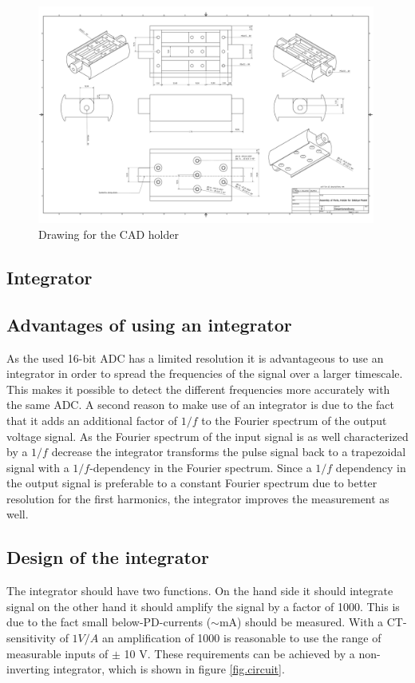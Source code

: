    
   \begin{figure}
\includegraphics[width=0.99\textwidth]{figures/Gesamtanordnung.pdf}
    \caption{Drawing for the CAD holder}
    \label{fig.CADdrawing}
   \end{figure}

\subsection{Integrator}
\subsection{Advantages of using an integrator}
As the used 16-bit ADC has a limited resolution it is advantageous to use an integrator in order to spread the frequencies of the signal over a larger timescale. This makes it possible to detect the different frequencies more accurately with the same ADC. 
A second reason to make use of an integrator is due to the fact that it adds an additional factor of $1/f$ to the Fourier spectrum of the output voltage signal. As the Fourier spectrum of the input signal is as well characterized by a $1/f$ decrease the integrator transforms the pulse signal back to a trapezoidal signal with a $1/f$-dependency in the Fourier spectrum. Since a $1/f$ dependency in the output signal is preferable to a constant Fourier spectrum due to better resolution for the first harmonics, the integrator improves the measurement as well. 

\subsection{Design of the integrator}
The integrator should have two functions. On the hand side it should integrate signal on the other hand it should amplify the signal by a factor of 1000. This is due to the fact small below-PD-currents ($\sim$mA) should be measured. With a CT-sensitivity of $1V/A$ an amplification of 1000 is reasonable to use the range of measurable inputs of $\pm$ 10 V. These requirements can be achieved by a non-inverting integrator, which is shown in figure  \ref{fig.circuit}. 

